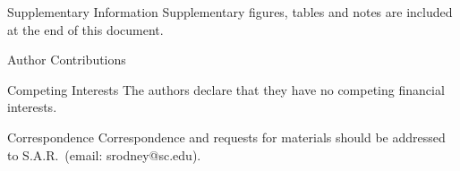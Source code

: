 \documentclass{nature_arxiv}
\begin{document}
\maketitle

\vspace{10pt}

\vspace{10pt}

\makeaffil









\clearpage
\begin{methods}
 
 
 
 
 
 
 
 
 
 
 
\end{methods}



\begin{addendum}
 \item[Supplementary Information] Supplementary figures, tables and notes are included at the end of this document.
 \item 
 \item[Author Contributions] 
 \item[Competing Interests] The authors declare that they have no competing financial interests.
 \item[Correspondence] Correspondence and requests for materials
should be addressed to S.A.R.~(email: srodney@sc.edu).
\end{addendum}






\clearpage

\end{document}
